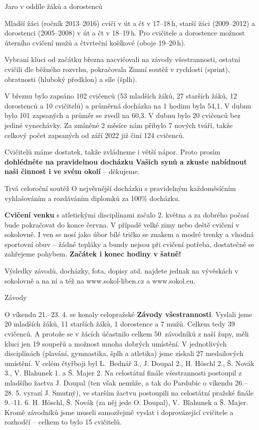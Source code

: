 \documentclass[11pt]{article}
\newcommand{\post}[1]{%
\begin{center}
{\huge \tyrs #1}
\end{center}
}
\newcommand{\subpost}[1]{%
\vspace*{12pt}
\begin{center}
{\Large \tyrs #1}
\end{center}}
\begin{document}
\restoregeometry
\pagestyle{standard}

\post{Jaro v oddíle žáků a dorostenců}
Mladší žáci (ročník 2013–2016) cvičí v út a čt v 17–18\,h, starší žáci (2009–2012) a dorostenci (2005–2008) v út a čt v 18–19\,h. Pro cvičitele a dorostence možnost úterního cvičení mužů a čtvrteční košíkové (oboje 19–20\,h). 

Vybraní kluci od začátku března nacvičovali na závody všestrannosti, ostatní cvičili dle běžného rozvrhu, pokračovala Zimní soutěž v rychlosti (sprint), obratnosti (hluboký předklon) a síle (šplh).

V březnu bylo zapsáno 102 cvičenců (53 mladších žáků, 27 starších žáků, 12 dorostenců a 10 cvičitelů) a průměrná docházka na 1 hodinu byla 54,1. V dubnu bylo 101 zapsaných a průměr se zvedl na 60,3. V dubnu bylo 20 cvičenců bez jediné vynechávky. Za zmíněné 2 měsíce nám přibylo 7 nových tváří, takže celkový počet zapsaných od září 2022 již činí 124 cvičenců.

Cvičitelů máme dostatek, takže zvládneme i větší nápor. Proto prosím \textbf{dohlédněte na pravidelnou docházku Vašich synů a zkuste nabídnout naši činnost i ve svém okolí} – děkujeme.

Trvá celoroční soutěž O nejvěrnější docházku s pravidelným každoměsíčním vyhlašováním a rozdáváním diplomků za 100\% docházku.  

\textbf{Cvičení venku} s atletickými disciplínami začalo 2. května a za dobrého počasí bude pokračovat do konce června. V případě velké zimy nebo deště cvičení v sokolovně. I ven se nosí jako úbor bílé tričko se znakem a modré trenky a vhodná sportovní obuv – žádné tepláky a bundy nejsou při cvičení potřeba, dostatečně se zahřejeme pohybem. \textbf{Začátek i konec hodiny v šatně!} 

Výsledky závodů, docházky, fota, dopisy atd. najdete jednak na vývěskách v sokolovně a na ní a též na www.sokol-liben.cz a www.sokol.eu.

\subpost{Závody}
O víkendu 21.–23. 4. se konaly celopražské \textbf{Závody všestrannosti}. Vyslali jsme 20 mladších žáků, 11 starších žáků, 1 dorostence a 7 mužů. Celkem tedy 39 cvičenců. A protože se v žácích účastnilo celkem 50~závodníků z naší župy, měli kluci jen 19 soupeřů a možnost mnoha dobrých umístění. V jednotlivých disciplínách (plavání, gymnastika, šplh a atletika) jsme získali 27 medailových umístění. V celém čtyřboji byl L.~Bednář 3., J. Doupal 2., H. Höschl 2., Š. Novák 3., V. Blahunek 1. a Š. Majer 2. Na celostátní finále všestrannosti postoupil z mladšího žactva J. Doupal (ten však nemůže, a tak do Pardubic o víkendu 26.–28. 5. vyrazí J. Smutný), ve starším žactvu postoupili na celostátní pražské finále 9.–11. 6. H. Höschl, Š. Novák (za něj jede O. Doupal), V.~Blahunek a Š. Majer. Kromě závodníků jsme museli samozřejmě vyslat i doprovázející cvičitele a rozhodčí – celkem to bylo 15 cvičitelů.
\end{document}
